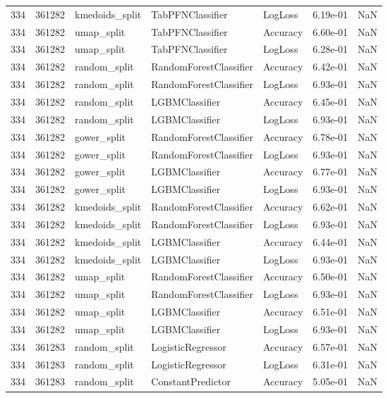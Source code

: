 \begin{tabular}{rrlllrr}
334 & 361282 & kmedoids\_split & TabPFNClassifier & LogLoss & 6.19e-01 & NaN \\
334 & 361282 & umap\_split & TabPFNClassifier & Accuracy & 6.60e-01 & NaN \\
334 & 361282 & umap\_split & TabPFNClassifier & LogLoss & 6.28e-01 & NaN \\
334 & 361282 & random\_split & RandomForestClassifier & Accuracy & 6.42e-01 & NaN \\
334 & 361282 & random\_split & RandomForestClassifier & LogLoss & 6.93e-01 & NaN \\
334 & 361282 & random\_split & LGBMClassifier & Accuracy & 6.45e-01 & NaN \\
334 & 361282 & random\_split & LGBMClassifier & LogLoss & 6.93e-01 & NaN \\
334 & 361282 & gower\_split & RandomForestClassifier & Accuracy & 6.78e-01 & NaN \\
334 & 361282 & gower\_split & RandomForestClassifier & LogLoss & 6.93e-01 & NaN \\
334 & 361282 & gower\_split & LGBMClassifier & Accuracy & 6.77e-01 & NaN \\
334 & 361282 & gower\_split & LGBMClassifier & LogLoss & 6.93e-01 & NaN \\
334 & 361282 & kmedoids\_split & RandomForestClassifier & Accuracy & 6.62e-01 & NaN \\
334 & 361282 & kmedoids\_split & RandomForestClassifier & LogLoss & 6.93e-01 & NaN \\
334 & 361282 & kmedoids\_split & LGBMClassifier & Accuracy & 6.44e-01 & NaN \\
334 & 361282 & kmedoids\_split & LGBMClassifier & LogLoss & 6.93e-01 & NaN \\
334 & 361282 & umap\_split & RandomForestClassifier & Accuracy & 6.50e-01 & NaN \\
334 & 361282 & umap\_split & RandomForestClassifier & LogLoss & 6.93e-01 & NaN \\
334 & 361282 & umap\_split & LGBMClassifier & Accuracy & 6.51e-01 & NaN \\
334 & 361282 & umap\_split & LGBMClassifier & LogLoss & 6.93e-01 & NaN \\
334 & 361283 & random\_split & LogisticRegressor & Accuracy & 6.57e-01 & NaN \\
334 & 361283 & random\_split & LogisticRegressor & LogLoss & 6.31e-01 & NaN \\
334 & 361283 & random\_split & ConstantPredictor & Accuracy & 5.05e-01 & NaN \\

\end{tabular}

